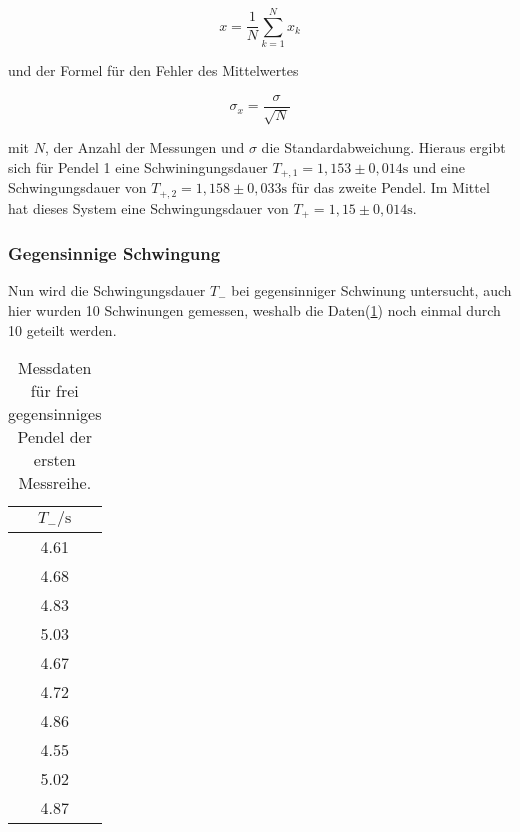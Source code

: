             \begin{equation}
                x = \frac{1}{N} \sum_{k=1}^{N} x_k
                \label{eqn:mittel}
            \end{equation}

            \noindent und der Formel für den Fehler des Mittelwertes

            \begin{equation}
                \sigma_{x} = \frac{\sigma}{\sqrt{N}}
                \label{eqn:mif}
            \end{equation}

            \noindent mit $N$, der Anzahl der Messungen und $\sigma$ die Standardabweichung. Hieraus ergibt sich für Pendel 1 eine 
            Schwiningungsdauer $T_{+,1} = 1,153 \pm 0,014 \si{\second}$ und eine Schwingungsdauer von 
            $T_{+,2} = 1,158 \pm 0,033 \si{\second}$ für das zweite Pendel. Im Mittel hat dieses System eine Schwingungsdauer von 
            $T_+ = 1,15 \pm 0,014 \si{\second}$.

        \subsubsection{Gegensinnige Schwingung}
            
            \noindent Nun wird die Schwingungsdauer $T_{-}$ bei gegensinniger Schwinung untersucht, auch hier wurden 10 Schwinungen gemessen, 
            weshalb die Daten(\ref{tab:geg1}) noch einmal durch 10 geteilt werden.

            \begin{table}[ht]
                \centering
                \caption{Messdaten für frei gegensinniges Pendel der ersten Messreihe.}
                \label{tab:geg1}
                \begin{tabular}{c }
                 \toprule
                 $T_- / \si{\s}$ \\
                 \midrule
                 4.61  \\ 
                 4.68  \\ 
                 4.83  \\ 
                 5.03  \\ 
                 4.67  \\ 
                 4.72  \\ 
                 4.86  \\ 
                 4.55  \\ 
                 5.02  \\ 
                 4.87  \\ 
                \end{tabular}
            \end{table}


